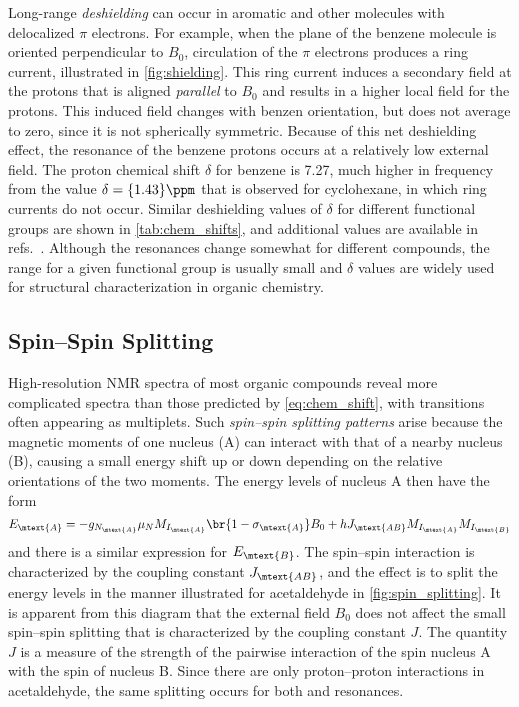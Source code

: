 \documentclass[nobib,nofonts,nols,nohyper]{tufte-handout}
\begin{document}
Long-range \emph{deshielding} can occur in aromatic and other molecules with delocalized \( \pi \) electrons. 
For example, when the plane of the benzene molecule is oriented perpendicular to \( B_0 \), circulation of the \( \pi \) electrons produces a ring current, illustrated in \cref{fig:shielding}. 
This ring current induces a secondary field at the protons that is aligned \emph{parallel} to \( B_0 \) and results in a higher local field for the protons. 
This induced field changes with benzen orientation, but does not average to zero, since it is not spherically symmetric. 
Because of this net deshielding effect, the resonance of the benzene protons occurs at a relatively low external field. 
The proton chemical shift \( \delta  \) for benzene is \qty{7.27}{\ppm}, much higher in frequency from the value \( \delta = \qty{1.43}{\ppm} \) that is observed for cyclohexane, in which ring currents do not occur. 
Similar deshielding values of \( \delta \) for different functional groups are shown in \cref{tab:chem_shifts}, and additional values are available in refs.~\autocite{davis1965advanced,pople1959nmr,silverstein2005spec,sdbs2020,aldrich1993nmr}.
Although the resonances change somewhat for different compounds, the range for a given functional group is usually small and \( \delta \) values are widely used for structural characterization in organic chemistry. 



\subsection{Spin--Spin Splitting} %
\label{sub:spin_spin_splitting}

High-resolution NMR spectra of most organic compounds reveal more complicated spectra than those predicted by \cref{eq:chem_shift}, with transitions often appearing as multiplets.
Such \emph{spin--spin splitting patterns} arise because the magnetic moments of one nucleus (A) can interact with that of a nearby nucleus (B), causing a small energy shift up or down depending on the relative orientations of the two moments. 
The energy levels of nucleus A then have the form 
\begin{equation}
	E_\mtext{A} = -g_{N_\mtext{A}} \mu_N M_{I_\mtext{A}} \br{1-\sigma_\mtext{A}} B_0
		+ h J_\mtext{AB} M_{I_\mtext{A}} M_{I_\mtext{B}}
	\label{eq:j_coupling}
\end{equation}
and there is a similar expression for \( E_\mtext{B} \). 
The spin--spin interaction is characterized by the coupling constant \( J_\mtext{AB} \), and the effect is to split the energy levels in the manner illustrated for acetaldehyde in \cref{fig:spin_splitting}. 
It is apparent from this diagram that the external field \( B_0 \) does not affect the small spin--spin splitting that is characterized by the coupling constant \( J \). 
The quantity \( J \) is a measure of the strength of the pairwise interaction of the spin nucleus A with the spin of nucleus B. 
Since there are only proton--proton interactions in acetaldehyde, the same splitting occurs for both  and  resonances. 
\end{document}
